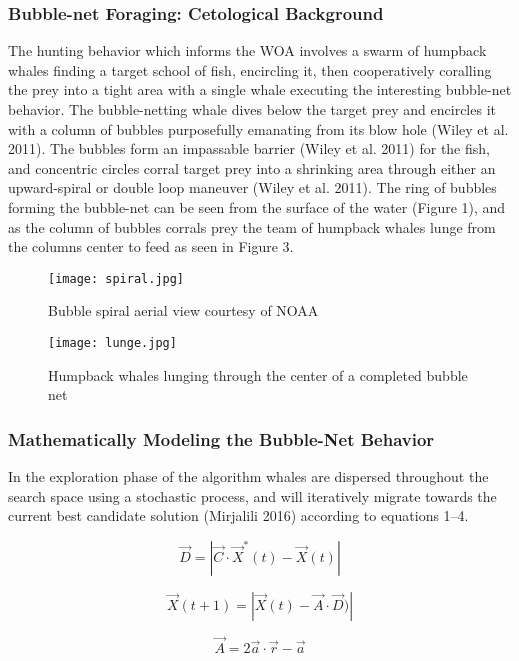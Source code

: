 \documentclass[11pt]{article}
\begin{document}
\subsubsection*{Bubble-net Foraging: Cetological Background}
The hunting behavior which informs the WOA involves a swarm of humpback whales finding a target school of fish, encircling it, then cooperatively coralling the prey into a tight area with a single whale executing the interesting bubble-net behavior.
The bubble-netting whale dives below the target prey and encircles it with a column of bubbles purposefully emanating from its blow hole (Wiley et al. 2011).
The bubbles form an impassable barrier (Wiley et al. 2011) for the fish, and concentric circles corral target prey into a shrinking area through either an upward-spiral or double loop maneuver (Wiley et al. 2011).
The ring of bubbles forming the bubble-net can be seen from the surface of the water (Figure 1), and as the column of bubbles corrals prey the team of humpback whales lunge from the columns center to feed as seen in Figure 3.

\begin{figure}[h]
	\centering
	\caption{Bubble spiral aerial view courtesy of NOAA}
	\texttt{[image: spiral.jpg]}
\end{figure}

\begin{figure}[h]
	\centering
	\caption{Humpback whales lunging through the center of a completed bubble net}
	\texttt{[image: lunge.jpg]}
\end{figure}

\subsubsection*{Mathematically Modeling the Bubble-Net Behavior}
In the exploration phase of the algorithm whales are dispersed throughout the search space using a stochastic process, and will iteratively migrate towards the current best candidate solution (Mirjalili 2016) according to equations 1--4.

\begin{equation}
	\vec{D} = |\vec{C}\cdot\vec{X}^*(t) - \vec{X}(t)|
\end{equation}

\begin{equation}
	\vec{X}(t + 1) = |\vec{X}(t) - \vec{A}\cdot\vec{D})|
\end{equation}

\begin{equation}
	\vec{A} = 2\vec{a}\cdot\vec{r}-\vec{a}
\end{equation}
\end{document}
